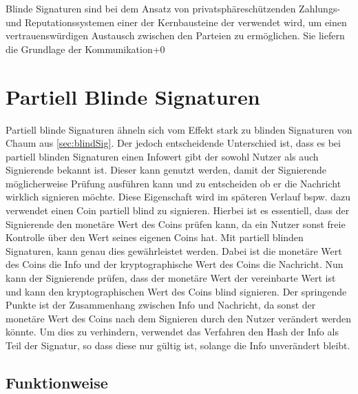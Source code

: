 \documentclass[11pt,a4paper]{scrreprt}
\begin{document}
Blinde Signaturen sind bei dem Ansatz von privatsphäreschützenden Zahlungs- und Reputationssystemen einer der Kernbausteine der verwendet wird, um einen vertrauenswürdigen Austausch zwischen den Parteien zu ermöglichen. Sie liefern die Grundlage der Kommunikation+0

\section{Partiell Blinde Signaturen}
\label{sec:partBlindSig}
Partiell blinde Signaturen ähneln sich vom Effekt stark zu blinden Signaturen von Chaum aus \ref{sec:blindSig}. Der jedoch entscheidende Unterschied ist, dass es bei partiell blinden Signaturen einen Infowert gibt der sowohl Nutzer als auch Signierende bekannt ist. Dieser kann genutzt werden, damit der Signierende möglicherweise Prüfung ausführen kann und zu entscheiden ob er die Nachricht wirklich signieren möchte. Diese Eigenschaft wird im späteren Verlauf bspw. dazu verwendet einen Coin partiell blind zu signieren. Hierbei ist es essentiell, dass der Signierende den monetäre Wert des Coins prüfen kann, da ein Nutzer sonst freie Kontrolle über den Wert seines eigenen Coins hat. Mit partiell blinden Signaturen, kann genau dies gewährleistet werden. Dabei ist die monetäre Wert des Coins die Info und der kryptographische Wert des Coins die Nachricht. Nun kann der Signierende prüfen, dass der monetäre Wert der vereinbarte Wert ist und kann den kryptographischen Wert des Coins blind signieren. Der springende Punkte ist der Zusammenhang zwischen Info und Nachricht, da sonst der monetäre Wert des Coins nach dem Signieren durch den Nutzer verändert werden könnte. Um dies zu verhindern, verwendet das Verfahren den Hash der Info als Teil der Signatur, so dass diese nur gültig ist, solange die Info unverändert bleibt.

\subsection{Funktionweise}
\end{document}
